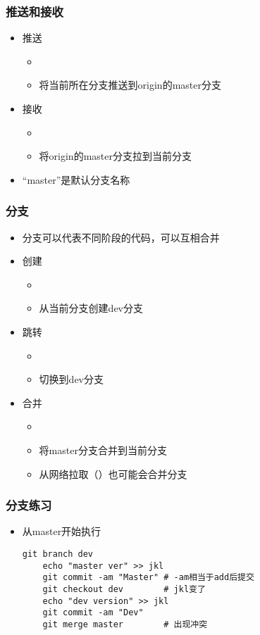 \begin{CJK}{UTF8}{gbsn}
\begin{frame} [fragile]
	\frametitle{推送和接收}
	\linespread{1.5}
	\begin{itemize}
	\item 推送
		\begin{itemize}
		\item {}
		\item 将当前所在分支推送到origin的master分支
		\end{itemize}
	\item 接收
		\begin{itemize}
		\item {}
		\item 将origin的master分支拉到当前分支
		\end{itemize}
	\item ``master''是默认分支名称
	\end{itemize}
\end{frame}

\begin{frame} [fragile]
	\frametitle{分支}
	\linespread{1.25}
	\begin{itemize}
	\item 分支可以代表不同阶段的代码，可以互相合并
	\item 创建
		\begin{itemize}
		\item {}
		\item 从当前分支创建dev分支
		\end{itemize}
	\item 跳转
		\begin{itemize}
		\item {}
		\item 切换到dev分支
		\end{itemize}
	\item 合并
		\begin{itemize}
		\item {}
		\item 将master分支合并到当前分支
		\item 从网络拉取（）也可能会合并分支
		\end{itemize}
	\end{itemize}
\end{frame}

\begin{frame} [fragile]
	\frametitle{分支练习}
	\linespread{1.5}
	\begin{itemize}
	\item 从master开始执行
	\begin{lstlisting}[style=bashstyle, gobble=4, texcl, escapechar=@]
	git branch dev
	echo "master ver" >> jkl
	git commit -am "Master"	# -am相当于add后提交
	git checkout dev		# jkl变了
	echo "dev version" >> jkl
	git commit -am "Dev"
	git merge master		# 出现冲突
	\end{lstlisting}
	\end{itemize}
\end{frame}


\end{CJK}
